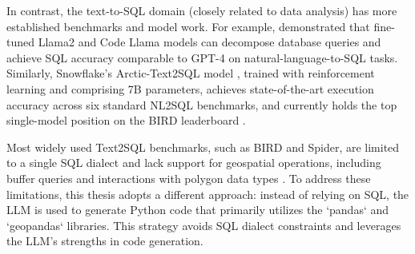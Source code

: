 In contrast, the text-to-SQL domain (closely related to data analysis) has more established benchmarks and model work. For example, \cite{Dominguez2024BlarSQL} demonstrated that fine-tuned Llama2 and Code Llama models can decompose database queries and achieve SQL accuracy comparable to GPT-4 on natural-language-to-SQL tasks. Similarly, Snowflake's Arctic-Text2SQL model \cite{Yao2025ArcticText2SQLR1}, trained with reinforcement learning and comprising 7B parameters, achieves state-of-the-art execution accuracy across six standard NL2SQL benchmarks, and currently holds the top single-model position on the BIRD leaderboard \cite{Li2023BirdSQL}.

Most widely used Text2SQL benchmarks, such as BIRD and Spider, are limited to a single SQL dialect and lack support for geospatial operations, including buffer queries and interactions with polygon data types \cite{Li2023BirdSQL, Yu2019Spider}. To address these limitations, this thesis adopts a different approach: instead of relying on SQL, the LLM is used to generate Python code that primarily utilizes the `pandas` and `geopandas` libraries. This strategy avoids SQL dialect constraints and leverages the LLM's strengths in code generation.





